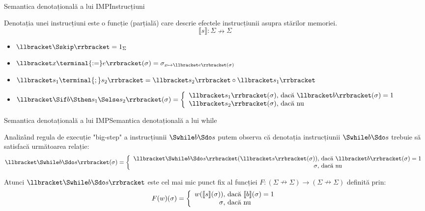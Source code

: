 \documentclass[xcolor=pdftex,romanian,colorlinks]{beamer}
\begin{document}
\begin{frame}{Semantica denotațională a lui IMP}{Instrucțiuni}

  Denotația unei instrucțiuni este o funcție (parțială) care descrie efectele instrucțiunii asupra stărilor memoriei.
  $$\llbracket s \rrbracket : \Sigma \nrightarrow \Sigma$$
  \begin{itemize}
  \item $\llbracket \Sskip \rrbracket = 1_\Sigma$
  \item $\llbracket x \terminal{:=} e \rrbracket(\sigma) = \sigma_{x \mapsto \llbracket e \rrbracket(\sigma)}$
  \item $\llbracket s_1 \terminal{;} s_2 \rrbracket = \llbracket s_2 \rrbracket \circ \llbracket s_1 \rrbracket$
  \item $\llbracket \Sif b \Sthen s_1 \Selse s_2 \rrbracket(\sigma) = \left\{\begin{array}{r@{\mbox{, dacă }}l} \llbracket s_1 \rrbracket(\sigma) & \llbracket b \rrbracket(\sigma) = 1
  \\{} \llbracket s_2 \rrbracket(\sigma) & \mbox{nu}\end{array}\right.$
  \end{itemize}
\end{frame}

\begin{frame}{Semantica denotațională a lui IMP}{Semantica denotațională a lui while}

Analizând regula de execuție "big-step" a instrucțiunii $\Swhile b \Sdo s$ putem observa că denotația instrucțiunii $\Swhile b \Sdo s$ trebuie să satisfacă următoarea relație:
  $$\llbracket \Swhile b \Sdo s \rrbracket(\sigma) = \left\{\begin{array}{r@{\mbox{, dacă }}l} \llbracket \Swhile b \Sdo s \rrbracket(\llbracket s \rrbracket(\sigma)) & \llbracket b \rrbracket(\sigma) = 1
   \\{} \sigma & \mbox{nu}\end{array}\right.$$

Atunci $\llbracket \Swhile b \Sdo s \rrbracket$ este cel mai mic punct fix al funcției $F : (\Sigma \nrightarrow \Sigma) \to (\Sigma \nrightarrow \Sigma)$ definită prin:
$$F(w)(\sigma) = \left\{\begin{array}{r@{\mbox{, dacă }}l} w(\llbracket s \rrbracket(\sigma)) & \llbracket b \rrbracket(\sigma) = 1
 \\{} \sigma & \mbox{nu}\end{array}\right.$$

\end{frame}
\end{document}
